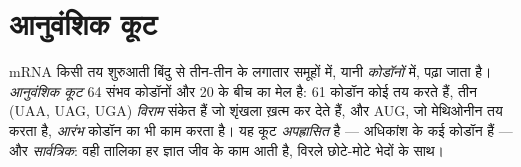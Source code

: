 \section{आनुवंशिक कूट}

\begin{definition}[कोडॉन और आनुवंशिक कूट]\label{def:g11:gene-expression:code}
mRNA किसी तय शुरुआती बिंदु से तीन-तीन  के लगातार समूहों
में, यानी \emph{कोडॉनों} में, पढ़ा जाता है।
\emph{आनुवंशिक कूट} 64 संभव कोडॉनों और 20  के बीच का मेल है: 61 कोडॉन कोई  तय करते हैं, तीन (UAA,
UAG, UGA) \emph{विराम} संकेत हैं जो शृंखला ख़त्म कर देते हैं, और AUG, जो
मेथिओनीन तय करता है, \emph{आरंभ} कोडॉन का भी काम करता है। यह कूट
\emph{अपह्रासित} है --- अधिकांश  के कई कोडॉन हैं --- और
\emph{सार्वत्रिक}: वही तालिका हर ज्ञात जीव के काम आती है, विरले छोटे-मोटे
भेदों के साथ।
\end{definition}

